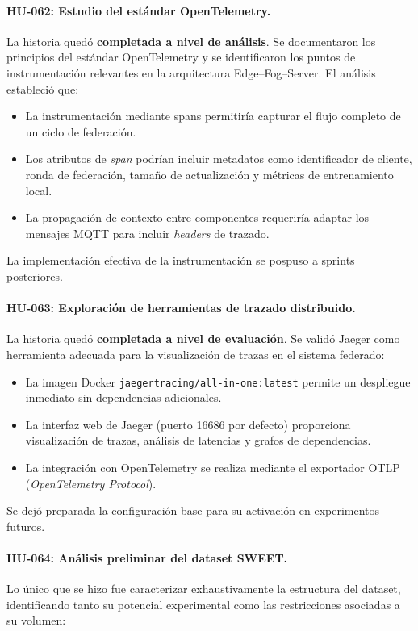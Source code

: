 \documentclass{report}
\begin{document}
\vspace{0.15em}
\paragraph{HU-062: Estudio del estándar OpenTelemetry.}
La historia quedó \textbf{completada a nivel de análisis}. Se documentaron los principios del estándar OpenTelemetry y se identificaron los puntos de instrumentación relevantes en la arquitectura Edge--Fog--Server. El análisis estableció que:
\begin{itemize}
    \item La instrumentación mediante spans permitiría capturar el flujo completo de un ciclo de federación.
    \item Los atributos de \textit{span} podrían incluir metadatos como identificador de cliente, ronda de federación, tamaño de actualización y métricas de entrenamiento local.
    \item La propagación de contexto entre componentes requeriría adaptar los mensajes MQTT para incluir \textit{headers} de trazado.
\end{itemize}
La implementación efectiva de la instrumentación se pospuso a sprints posteriores.
\vspace{0.15em}
\paragraph{HU-063: Exploración de herramientas de trazado distribuido.}
La historia quedó \textbf{completada a nivel de evaluación}. Se validó Jaeger como herramienta adecuada para la visualización de trazas en el sistema federado:
\begin{itemize}
    \item La imagen Docker \texttt{jaegertracing/all-in-one:latest} permite un despliegue inmediato sin dependencias adicionales.
    \item La interfaz web de Jaeger (puerto 16686 por defecto) proporciona visualización de trazas, análisis de latencias y grafos de dependencias.
    \item La integración con OpenTelemetry se realiza mediante el exportador OTLP (\textit{OpenTelemetry Protocol}).
\end{itemize}
Se dejó preparada la configuración base para su activación en experimentos futuros.

\vspace{0.15em}
\paragraph{HU-064: Análisis preliminar del dataset SWEET.}
Lo único que se hizo fue caracterizar exhaustivamente la estructura del dataset, identificando tanto su potencial experimental como las restricciones asociadas a su volumen:
\end{document}
